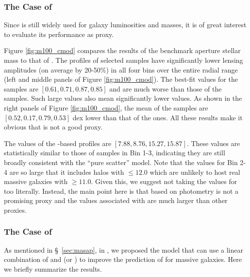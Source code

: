 \documentclass[fleqn,usenatbib,useAMS]{mnras}
\begin{document}
\begin{CJK*}{UTF8}{gbsn}
\subsubsection{The Case of \mcmodel{}}
    \label{sec:m100_cmodel}

    Since \cmodel{} is still widely used for galaxy luminosities and masses, it is of great
    interest to evaluate its performance as \mvir{} proxy. 
    
    Figure \ref{fig:m100_cmod} compares the \topn{} results of the benchmark aperture stellar mass
     to that of \mcmodel{}.  
    The \dsigma{} profiles of \mcmodel{} selected samples have significantly lower lensing
    amplitudes (on average by 20-50\%) in all four bins over the entire radial range (left and
    middle panels of Figure \ref{fig:m100_cmod}). 
    The best-fit \sigmvir{} values for the \mcmodel{} samples are $[0.61, 0.71, 0.87, 0.85]$ and are
    much worse than those of the  samples.
    Such large \sigmvir{} values also mean significantly lower \mvir{} values.
    As shown in the right panels of Figure \ref{fig:m100_cmod}, the mean \mvir{} of the \mcmodel{}
    \topn{} samples are $[0.52, 0.17, 0.79, 0.53]$ dex lower than that of the \maper{} ones.
    All these results make it  obvious that \cmodel{} is not a good \mvir{} proxy. 

    The \chisq{} values of the \mcmodel{}-based \dsigma{} profiles are $[7.88, 8.76, 15.27, 15.87]$.
    These values are statistically similar to those of  samples in Bin 1-3, indicating 
    they are still broadly consistent with the ``pure scatter'' model.
    Note that the \sigmvir{} values for Bin 2-4 are so large that it includes halos with
    \logmvir{}$\leq 12.0$ which are unlikely to host real massive galaxies with 
    \logmcmodel{}$\geq 11.0$. 
    Given this, we suggest not taking the \sigmvir{} values for \mcmodel{} too literally.
    Instead, the main point here is that \mstar{} based on \cmodel{} photometry is not a promising
    \mvir{} proxy and the \sigmvir{} values associated with \mcmodel{} are much larger than other
    proxies.

\subsubsection{The Case of \masap{}}
    \label{sec:asap_result}

    As mentioned in \S\ \ref{sec:masap}, in \citet{Huang2020}, we proposed the \asap{} model that
    can use a linear combination of  and  (or \mmax{}) to improve the 
    prediction of \mvir{} for massive galaxies. 
    Here we briefly summarize the results.


\end{CJK*}
\end{document}
